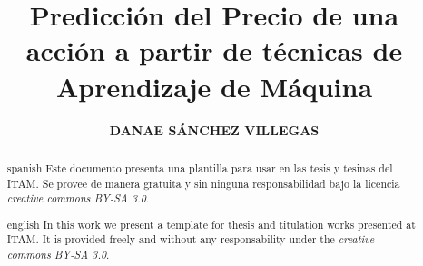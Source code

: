 \documentclass{tesisITAM}
\title{Predicción del Precio de una acción a partir de técnicas de Aprendizaje de Máquina}
\author{\textbf{DANAE SÁNCHEZ VILLEGAS}}
\begin{document}
	\maketitle
	\publicationrights


	\begin{abstract}{spanish}
		Este documento presenta una plantilla para usar en las tesis y tesinas del ITAM. Se provee de manera gratuita y sin ninguna responsabilidad bajo la licencia \emph{creative commons BY-SA 3.0}.
	\end{abstract}

	\begin{abstract}{english}
		In this work we present a template for thesis and titulation works presented at ITAM. It is provided freely and without any responsability under the \emph{creative commons BY-SA 3.0}. 
	\end{abstract}


	\setcounter{page}{1}

	\tableofcontents
	\listoffigures
	\listoftables
	\newpage

	\setcounter{page}{1}

	 
	
    



 

	\appendix

	\clearpage
	

	
	 
\end{document}
